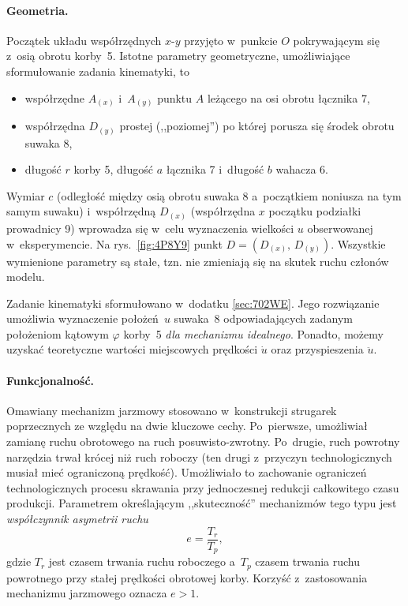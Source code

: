 \documentclass[paper=a4,DIV=12]{tmmlab}
\begin{document}
\paragraph{Geometria.} Początek układu współrzędnych $x$-$y$ przyjęto w~punkcie
$O$ pokrywającym się z~osią obrotu korby~5. Istotne parametry geometryczne,
umożliwiające sformułowanie zadania kinematyki, to
\begin{itemize}
  \item współrzędne $A_{(x)}$ i~$A_{(y)}$ punktu $A$ leżącego na osi obrotu łącznika 7,
  \item współrzędna $D_{(y)}$ prostej (,,poziomej'') po której porusza się środek obrotu suwaka 8,
  \item długość $r$ korby 5, długość $a$ łącznika 7 i~długość $b$ wahacza 6.
\end{itemize}
Wymiar $c$ (odległość między osią obrotu suwaka 8 a~początkiem noniusza na
tym samym suwaku) i~współrzędną $D_{(x)}$ (współrzędna $x$ początku podziałki
prowadnicy 9) wprowadza się w~celu wyznaczenia wielkości $u$ obserwowanej
w~eksperymencie. Na rys.~\ref{fig:4P8Y9} punkt $D =
\left(D_{(x)},\,D_{(y)}\right)$. Wszystkie wymienione parametry są stałe, tzn.
nie zmieniają się na skutek ruchu członów modelu.

Zadanie kinematyki sformułowano w~dodatku \ref{sec:702WE}. Jego rozwiązanie
umożliwia wyznaczenie położeń~$u$ suwaka~8 odpowiadających zadanym położeniom
kątowym $\varphi$ korby~5 \emph{dla mechanizmu idealnego}. Ponadto, możemy
uzyskać teoretyczne wartości miejscowych prędkości $\dot u$ oraz przyspieszenia
$\ddot u$.

\paragraph{Funkcjonalność.} Omawiany mechanizm jarzmowy stosowano w~konstrukcji
strugarek poprzecznych ze względu na dwie kluczowe cechy. Po~pierwsze,
umożliwiał zamianę ruchu obrotowego na ruch posuwisto-zwrotny. Po~drugie, ruch
powrotny narzędzia trwał krócej niż ruch roboczy (ten drugi z~przyczyn
technologicznych musiał mieć ograniczoną prędkość). Umożliwiało to zachowanie
ograniczeń technologicznych procesu skrawania przy jednoczesnej redukcji
całkowitego czasu produkcji. Parametrem określającym ,,skuteczność''
mechanizmów tego typu jest \emph{współczynnik asymetrii ruchu}
\begin{equation}
  e = \frac{T_r}{T_p},
  \label{eq:HMRCL}
\end{equation}
gdzie $T_r$ jest czasem trwania ruchu roboczego a~$T_p$ czasem trwania ruchu
powrotnego przy stałej prędkości obrotowej korby. Korzyść z~zastosowania
mechanizmu jarzmowego oznacza $e > 1$.
\end{document}
